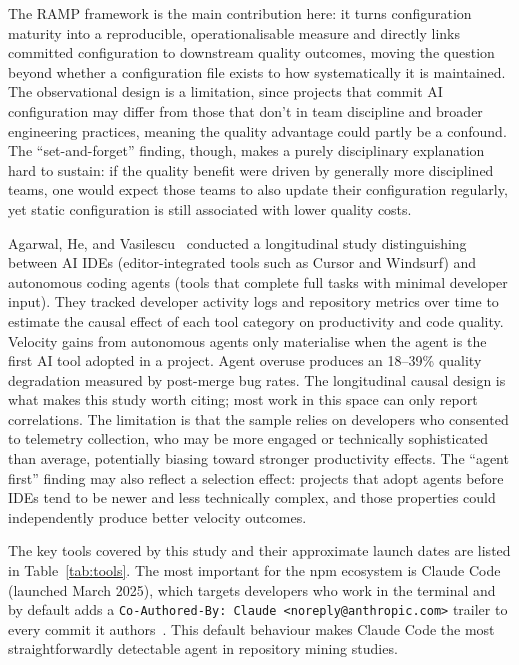 The RAMP framework is the main contribution here: it turns configuration maturity
into a reproducible, operationalisable measure and directly links committed
configuration to downstream quality outcomes, moving the question beyond whether a
configuration file exists to how systematically it is maintained. The observational
design is a limitation, since projects that commit AI configuration may differ from
those that don't in team discipline and broader engineering practices, meaning the
quality advantage could partly be a confound. The ``set-and-forget'' finding, though,
makes a purely disciplinary explanation hard to sustain: if the quality benefit were
driven by generally more disciplined teams, one would expect those teams to also
update their configuration regularly, yet static configuration is still associated
with lower quality costs.

Agarwal, He, and Vasilescu~\cite{agarwal2026} conducted a longitudinal study
distinguishing between AI IDEs (editor-integrated tools such as Cursor and
Windsurf) and autonomous coding agents (tools that complete full tasks with minimal
developer input). They tracked developer activity logs and repository metrics over
time to estimate the causal effect of each tool category on productivity and code
quality. Velocity gains from autonomous agents only materialise when the agent is
the first AI tool adopted in a project. Agent overuse produces an 18--39\%
quality degradation measured by post-merge bug rates. The longitudinal causal design
is what makes this study worth citing; most work in this space can only report
correlations. The limitation is that the sample relies on developers who consented
to telemetry collection, who may be more engaged or technically sophisticated than
average, potentially biasing toward stronger productivity effects. The ``agent first''
finding may also reflect a selection effect: projects that adopt agents before IDEs
tend to be newer and less technically complex, and those properties could
independently produce better velocity outcomes.

The key tools covered by this study and their approximate launch dates are listed
in Table~\ref{tab:tools}. The most important for the npm ecosystem is Claude Code
(launched March 2025), which targets developers who work in the terminal and by
default adds a \texttt{Co-Authored-By: Claude <noreply@anthropic.com>} trailer to
every commit it authors~\cite{robbesHeuristics2026}. This default behaviour makes
Claude Code the most straightforwardly detectable agent in repository mining studies.

